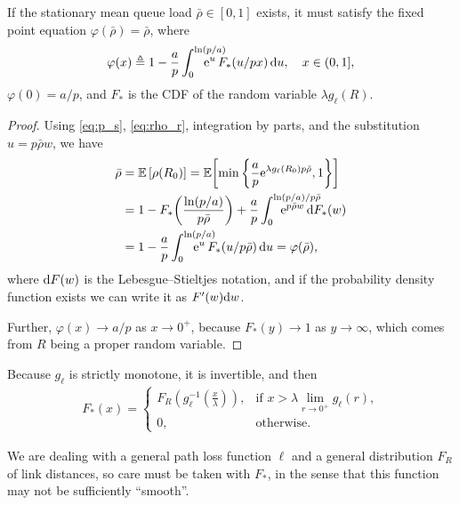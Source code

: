\begin{proposition}\label{prop:fixed_point}
    If the stationary mean queue load $\bar\rho\in[0,1]$ exists, it must satisfy the fixed point equation $\varphi(\bar\rho) = \bar\rho$, where
    \begin{align}\label{eq:fixed_point}
        \varphi(x) \triangleq 1 - \frac{a}{p} \int_0^{\ln(p/a)} \hspace{-7mm} \euler^u\,F_*(u/px)\,\d u, \quad x\in(0,1],
    \end{align}
    $\varphi(0)=a/p$, and $F_*$ is the CDF of the random variable $\lambda g_\ell(R)$.
\end{proposition}
%
\begin{proof}
    Using \eqref{eq:p_s}, \eqref{eq:rho_r}, integration by parts, and the substitution ${u = p\bar\rho w}$, we have
    \begin{align*}
        \bar\rho &= \E\left[\rho(R_0)\right] 
            = \E\!\left[\min\left\{ \frac{a}{p}\euler^{\lambda g_\ell(R_0) p \bar\rho}, 1 \right\} \right] \\
            &= 1 - F_*\!\left(\frac{\ln(p/a)}{p\bar\rho}\right) + \frac{a}{p} \int_0^{\ln(p/a)/p\bar\rho} \hspace{-12mm} \euler^{p\bar\rho w}\,\d F_*(w) \\
            &= 1 - \frac{a}{p} \int_0^{\ln(p/a)} \hspace{-7mm} \euler^u\,F_*(u/p\bar\rho)\,\d u = \varphi(\bar\rho),
    \end{align*}
    where $\mathrm{d} F(w)$ is the Lebesgue--Stieltjes notation, and if the probability density function exists we can write it as $F'(w) \mathrm{d} w$.
    
    Further, $\varphi(x) \to a/p$ as $x\to 0^+$, because $F_*(y) \to 1$ as $y \to \infty$, which comes from $R$ being a proper random variable.
\end{proof}

Because $g_\ell$ is strictly monotone, it is invertible, and then
\begin{align}\label{eq:F_*}
    F_*(x) =
    \begin{cases}
        F_{R}\!\left(g_\ell^{-1}\!\left(\frac{x}{\lambda}\right)\right), & \text{if } x > \lambda \displaystyle\lim_{r\to 0^+} g_\ell(r),\\
        0, &\text{otherwise}.
    \end{cases}
\end{align}

\begin{remark}
    We are dealing with a general path loss function $\ell$ and a general distribution $F_R$ of link distances, so care must be taken with $F_*$, in the sense that this function may not be sufficiently ``smooth''.
\end{remark}


